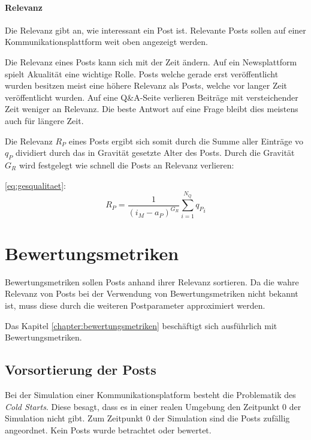 \paragraph{Relevanz}

Die Relevanz gibt an, wie interessant ein Post ist. Relevante Posts sollen auf einer Kommunikationsplattform weit oben angezeigt werden.

Die Relevanz eines Posts kann sich mit der Zeit ändern. Auf ein Newsplattform spielt Akualität eine wichtige Rolle. Posts welche gerade erst veröffentlicht wurden besitzen meist eine höhere Relevanz als Posts, welche vor langer Zeit veröffentlicht wurden. Auf eine Q\&A-Seite verlieren Beiträge mit versteichender Zeit weniger an Relevanz. Die beste Antwort auf eine Frage bleibt dies meistens auch für längere Zeit.

Die Relevanz $R_P$ eines Posts ergibt sich somit durch die Summe aller Einträge vo $q_P$ dividiert durch das in Gravität gesetzte Alter des Posts. Durch die Gravität $G_R$ wird festgelegt wie schnell die Posts an Relevanz verlieren:

 \ref{eq:gesqualitaet}:
\begin{equation}
\label{eq:gesqualitaet}
{R_P} = \frac{1}{(i_M - a_P)^{G_R}}\sum_{i=1}^{N_Q} {q_P}_i
\end{equation}

\section{Bewertungsmetriken}
\label{sec:bewertungsmetrik}

Bewertungsmetriken sollen Posts anhand ihrer Relevanz sortieren. Da die wahre Relevanz von Posts bei der Verwendung von Bewertungsmetriken nicht bekannt ist, muss diese durch die weiteren Postparameter approximiert werden.

Das Kapitel \ref{chapter:bewertungsmetriken} beschäftigt sich ausführlich mit Bewertungsmetriken.

\subsection{Vorsortierung der Posts}

Bei der Simulation einer Kommunikationsplatform besteht die Problematik des \textit{Cold Starts}. Diese besagt, dass es in einer realen Umgebung den Zeitpunkt $0$ der Simulation nicht gibt. Zum Zeitpunkt $0$ der Simulation sind die Posts zufällig angeordnet. Kein Posts wurde betrachtet oder bewertet.

